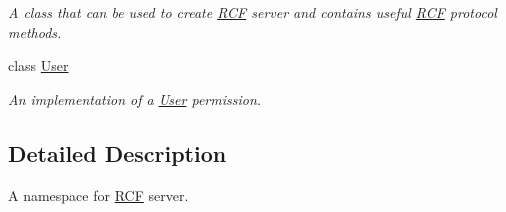 \begin{DoxyCompactItemize}
\begin{DoxyCompactList}\small\item\em A class that can be used to create \hyperlink{namespace_r_c_f}{R\+C\+F} server and contains useful \hyperlink{namespace_r_c_f}{R\+C\+F} protocol methods. \end{DoxyCompactList}\item 
class \hyperlink{class_r_c_f_1_1_server_1_1_user}{User}
\begin{DoxyCompactList}\small\item\em An implementation of a \hyperlink{class_r_c_f_1_1_server_1_1_user}{User} permission. \end{DoxyCompactList}\end{DoxyCompactItemize}


\subsection{Detailed Description}
A namespace for \hyperlink{namespace_r_c_f}{R\+C\+F} server. 